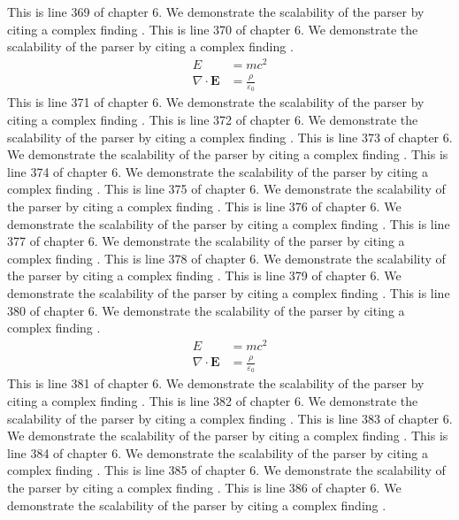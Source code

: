 This is line 369 of chapter 6. We demonstrate the scalability of the parser by citing a complex finding \cite{ref6_369}.
This is line 370 of chapter 6. We demonstrate the scalability of the parser by citing a complex finding \cite{ref6_370}.
\begin{align*}
  E &= mc^2 \\
  \nabla \cdot \mathbf{E} &= \frac{\rho}{\varepsilon_0}
\end{align*}
This is line 371 of chapter 6. We demonstrate the scalability of the parser by citing a complex finding \cite{ref6_371}.
This is line 372 of chapter 6. We demonstrate the scalability of the parser by citing a complex finding \cite{ref6_372}.
This is line 373 of chapter 6. We demonstrate the scalability of the parser by citing a complex finding \cite{ref6_373}.
This is line 374 of chapter 6. We demonstrate the scalability of the parser by citing a complex finding \cite{ref6_374}.
This is line 375 of chapter 6. We demonstrate the scalability of the parser by citing a complex finding \cite{ref6_375}.
This is line 376 of chapter 6. We demonstrate the scalability of the parser by citing a complex finding \cite{ref6_376}.
This is line 377 of chapter 6. We demonstrate the scalability of the parser by citing a complex finding \cite{ref6_377}.
This is line 378 of chapter 6. We demonstrate the scalability of the parser by citing a complex finding \cite{ref6_378}.
This is line 379 of chapter 6. We demonstrate the scalability of the parser by citing a complex finding \cite{ref6_379}.
This is line 380 of chapter 6. We demonstrate the scalability of the parser by citing a complex finding \cite{ref6_380}.
\begin{align*}
  E &= mc^2 \\
  \nabla \cdot \mathbf{E} &= \frac{\rho}{\varepsilon_0}
\end{align*}
This is line 381 of chapter 6. We demonstrate the scalability of the parser by citing a complex finding \cite{ref6_381}.
This is line 382 of chapter 6. We demonstrate the scalability of the parser by citing a complex finding \cite{ref6_382}.
This is line 383 of chapter 6. We demonstrate the scalability of the parser by citing a complex finding \cite{ref6_383}.
This is line 384 of chapter 6. We demonstrate the scalability of the parser by citing a complex finding \cite{ref6_384}.
This is line 385 of chapter 6. We demonstrate the scalability of the parser by citing a complex finding \cite{ref6_385}.
This is line 386 of chapter 6. We demonstrate the scalability of the parser by citing a complex finding \cite{ref6_386}.
